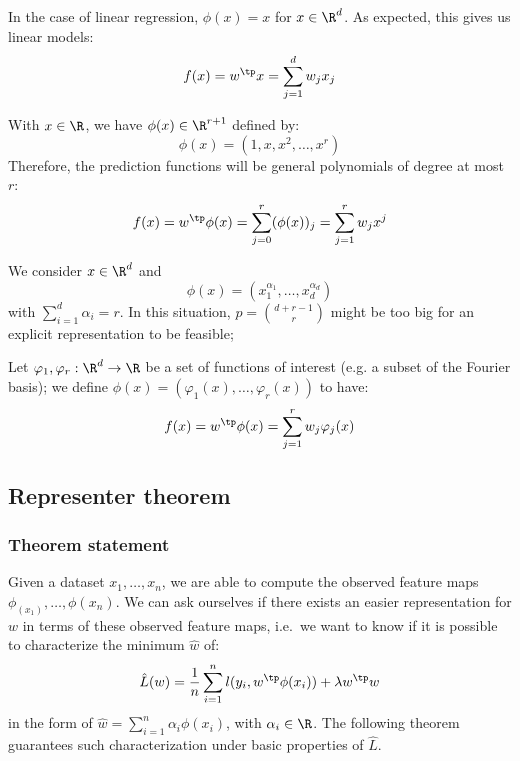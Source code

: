 \documentclass[toc]{../cs-classes/cs-classes}
\begin{document}
\begin{example}
    In the case of linear regression, $\phi(x)=x$ for $x\in\R^d$. As expected, this gives us linear models:
    \begin{equation*}
        f(x)=w^\tp x = \sum_{j=1}^d w_jx_j
    \end{equation*}
\end{example}

\begin{example}
    With $x\in\R$, we have $\phi(x)\in\R^{r+1}$ defined by:
    \begin{equation*}
        \phi(x)=(1, x, x^2, \dots, x^r)
    \end{equation*}
    Therefore, the prediction functions will be general polynomials of degree at most $r$:
    \begin{equation*}
        f(x)=w^\tp\phi(x)=\sum_{j=0}^r (\phi(x))_j = \sum_{j=1}^r w_jx^j
    \end{equation*}
\end{example}

\begin{example}
    We consider $x\in\R^d$ and
    \begin{equation*}
        \phi(x)=(x_1^{\alpha_1}, \dots, x_d^{\alpha_d})
    \end{equation*}
    with $\sum_{i=1}^d \alpha_i=r$. In this situation, $p=\binom{d+r-1}{r}$ might be too big for an explicit representation to be feasible;
\end{example}

\begin{example}
    Let $\varphi_1, \varphi_r : \R^d \to \R$ be a set of functions of interest (e.g. a subset of the Fourier basis); we define $\phi(x) = (\varphi_1(x), \dots, \varphi_r(x))$ to have:
    \begin{equation*}
        f(x)=w^\tp \phi(x) = \sum_{j=1}^rw_j\varphi_j(x)
    \end{equation*}
\end{example}

\subsection{Representer theorem}
\subsubsection{Theorem statement}
Given a dataset $x_1, \dots, x_n$, we are able to compute the observed feature maps $\phi_(x_1), \dots, \phi(x_n)$. We can ask ourselves if there exists an easier representation for $w$ in terms of these observed feature maps, i.e.~we want to know if it is possible to characterize the minimum $\hat{w}$ of:
\begin{equation*}
    \hat{L}(w) = \frac{1}{n}\sum_{i=1}^n l(y_i, w^\tp\phi(x_i)) + \lambda w^\tp w
\end{equation*}
in the form of $\hat{w} = \sum_{i=1}^n \alpha_i\phi(x_i)$, with $\alpha_i\in\R$. The following theorem guarantees such characterization under basic properties of $\hat{L}$.
\end{document}
